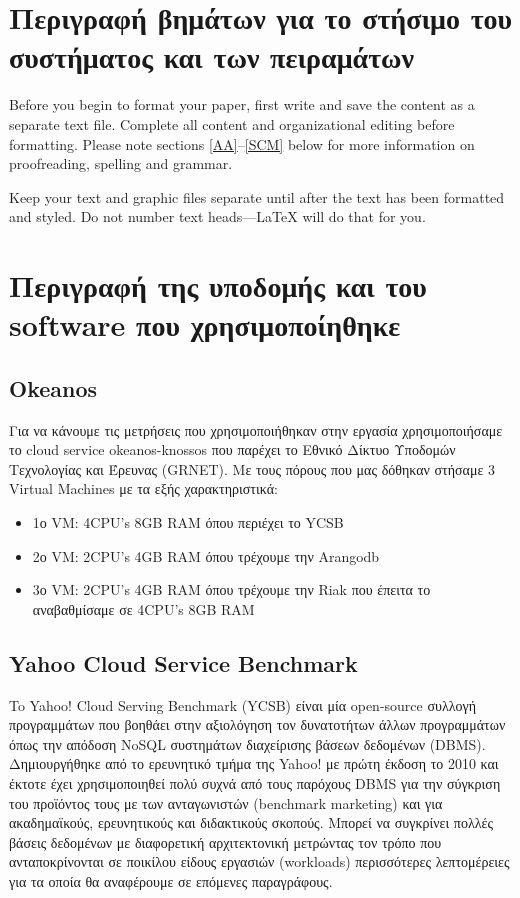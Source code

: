 \documentclass[conference]{IEEEtran}
\begin{document}
\section{Περιγραφή βημάτων για το στήσιμο του συστήματος και των πειραμάτων}
Before you begin to format your paper, first write and save the content as a 
separate text file. Complete all content and organizational editing before 
formatting. Please note sections \ref{AA}--\ref{SCM} below for more information on 
proofreading, spelling and grammar.

Keep your text and graphic files separate until after the text has been 
formatted and styled. Do not number text heads---{\LaTeX} will do that 
for you.

\section{Περιγραφή της υποδομής και του software που χρησιμοποίηθηκε}

\subsection{Okeanos}
Για να κάνουμε τις μετρήσεις που χρησιμοποιήθηκαν στην εργασία χρησιμοποιήσαμε το cloud service okeanos-knossos που παρέχει το Εθνικό Δίκτυο Υποδομών Τεχνολογίας και Έρευνας (GRNET). Mε τους πόρους που μας δόθηκαν στήσαμε 3 Virtual Machines με τα εξής χαρακτηριστικά:
\begin{itemize}

\item
1ο VM: 4CPU’s 8GB RAM όπου περιέχει το YCSB
\item
2ο VM: 2CPU’s 4GB RAM όπου τρέχουμε την Arangodb
\item
3ο VM: 2CPU’s 4GB RAM όπου τρέχουμε την Riak  που έπειτα το αναβαθμίσαμε σε 4CPU’s 8GB RAM

\end{itemize}

\subsection{Yahoo Cloud Service Benchmark}
        To Yahoo! Cloud Serving Benchmark (YCSB) είναι μία open-source συλλογή προγραμμάτων που βοηθάει στην αξιολόγηση τον δυνατοτήτων άλλων προγραμμάτων όπως την απόδοση NoSQL συστημάτων διαχείρισης βάσεων δεδομένων (DBMS). Δημιουργήθηκε από το ερευνητικό τμήμα της Yahoo! με πρώτη έκδοση το 2010 και έκτοτε έχει χρησιμοποιηθεί πολύ συχνά από τους παρόχους DBMS για την σύγκριση του προϊόντος τους με των ανταγωνιστών (benchmark marketing) και για ακαδημαϊκούς, ερευνητικούς και διδακτικούς σκοπούς. Μπορεί να συγκρίνει πολλές βάσεις δεδομένων με διαφορετική αρχιτεκτονική μετρώντας τον τρόπο που ανταποκρίνονται σε ποικίλου είδους εργασιών (workloads) περισσότερες λεπτομέρειες για τα οποία θα αναφέρουμε σε επόμενες παραγράφους.
       
\end{document}
